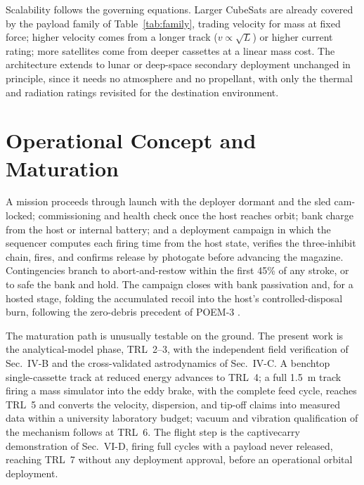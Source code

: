 \documentclass[conference]{IEEEtran}
\begin{document}
Scalability follows the governing equations. Larger CubeSats are already covered by the payload family of Table~\ref{tab:family}, trading velocity for mass at fixed force; higher velocity comes from a longer track ($v\propto\sqrt{L}$) or higher current rating; more satellites come from deeper cassettes at a linear mass cost. The architecture extends to lunar or deep-space secondary deployment unchanged in principle, since it needs no atmosphere and no propellant, with only the thermal and radiation ratings revisited for the destination environment.

\section{Operational Concept and Maturation}\label{sec:conops}
A mission proceeds through launch with the deployer dormant and the sled cam-locked; commissioning and health check once the host reaches orbit; bank charge from the host or internal battery; and a deployment campaign in which the sequencer computes each firing time from the host state, verifies the three-inhibit chain, fires, and confirms release by photogate before advancing the magazine. Contingencies branch to abort-and-restow within the first 45\% of any stroke, or to safe the bank and hold. The campaign closes with bank passivation and, for a hosted stage, folding the accumulated recoil into the host's controlled-disposal burn, following the zero-debris precedent of POEM-3 \cite{poem3}.

The maturation path is unusually testable on the ground. The present work is the analytical-model phase, TRL~2--3, with the independent field verification of Sec.~IV-B and the cross-validated astrodynamics of Sec.~IV-C. A benchtop single-cassette track at reduced energy advances to TRL~4; a full 1.5~m track firing a mass simulator into the eddy brake, with the complete feed cycle, reaches TRL~5 and converts the velocity, dispersion, and tip-off claims into measured data within a university laboratory budget; vacuum and vibration qualification of the mechanism follows at TRL~6. The flight step is the captive\-carry demonstration of Sec.~VI-D, firing full cycles with a payload never released, reaching TRL~7 without any deployment approval, before an operational orbital deployment.
\end{document}
